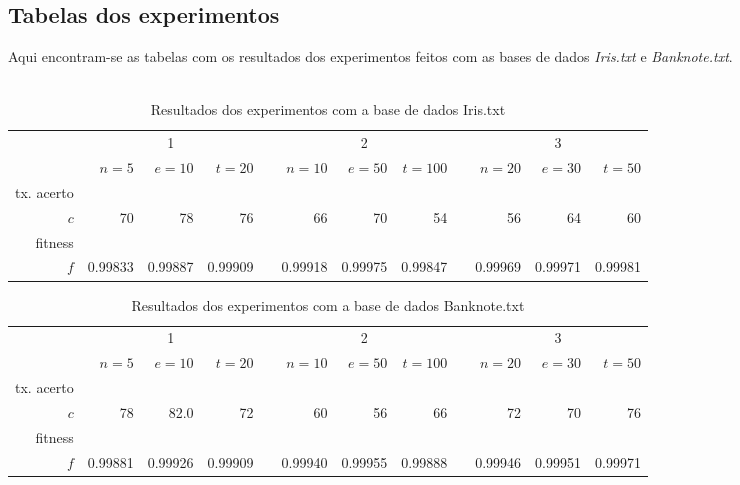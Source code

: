 \documentclass[10pt,twocolumn,letterpaper]{article}
\newcommand{\ra}[1]{\renewcommand{\arraystretch}{#1}}
\begin{document}
\subsection*{Tabelas dos experimentos}
Aqui encontram-se as tabelas com os resultados dos experimentos feitos com as bases de dados \textit{Iris.txt} e \textit{Banknote.txt}.\\\\
\begin{center}
\begin{table}[h]\centering
\ra{1.3}
\begin{tabular}{@{}rrrrcrrrcrrr@{}}\toprule
& \multicolumn{3}{c}{1} & \phantom{abc}& \multicolumn{3}{c}{2} &
\phantom{abc} & \multicolumn{3}{c}{3}\\
\cmidrule{2-4} \cmidrule{6-8} \cmidrule{10-12}
& $n=5$ & $e=10$ & $t=20$ && $n=10$ & $e=50$ & $t=100$ && $n=20$ & $e=30$ & $t=50$\\ \midrule
tx. acerto\\
$c$ & 70 & 78 & 76 && 66 & 70 & 54 && 56 & 64 & 60\\
fitness\\
$f$ & 0.99833& 0.99887& 0.99909&& 0.99918& 0.99975& 0.99847&& 0.99969& 0.99971& 0.99981\\
\bottomrule
\end{tabular}
\caption{Resultados dos experimentos com a base de dados Iris.txt}
\end{table}
\vskip 50pt
\begin{table}[h]\centering
\ra{1.3}
\begin{tabular}{@{}rrrrcrrrcrrr@{}}\toprule
& \multicolumn{3}{c}{1} & \phantom{abc}& \multicolumn{3}{c}{2} &
\phantom{abc} & \multicolumn{3}{c}{3}\\
\cmidrule{2-4} \cmidrule{6-8} \cmidrule{10-12}
& $n=5$ & $e=10$ & $t=20$ && $n=10$ & $e=50$ & $t=100$ && $n=20$ & $e=30$ & $t=50$\\ \midrule
tx. acerto\\
$c$ & 78 & 82.0 & 72 && 60 & 56 & 66 && 72 & 70 & 76\\
fitness\\
$f$ & 0.99881& 0.99926& 0.99909&& 0.99940& 0.99955& 0.99888&& 0.99946& 0.99951& 0.99971\\
\bottomrule
\end{tabular}
\caption{Resultados dos experimentos com a base de dados Banknote.txt}
\end{table}
\end{center}
\end{document}
